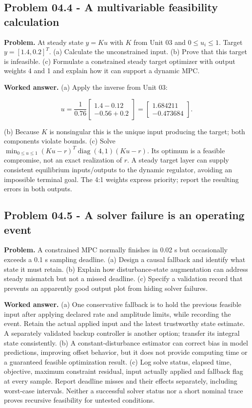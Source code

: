 \documentclass[11pt,a4paper]{article}
\begin{document}
\subsection{Problem 04.4 - A multivariable feasibility calculation}
\textbf{Problem.} At steady state $y=Ku$ with $K$ from Unit 03 and $0\leq u_i\leq1$. Target $y=[1.4,0.2]^T$. (a) Calculate the unconstrained input. (b) Prove that this target is infeasible. (c) Formulate a constrained steady target optimizer with output weights 4 and 1 and explain how it can support a dynamic MPC.


\textbf{Worked answer.} (a) Apply the inverse from Unit 03:


\[u=\frac{1}{0.76}\begin{bmatrix}1.4-0.12\\-0.56+0.2\end{bmatrix}=\begin{bmatrix}1.684211\\-0.473684\end{bmatrix}.\]

(b) Because $K$ is nonsingular this is the unique input producing the target; both components violate bounds. (c) Solve $\min_{0\leq u\leq1}(Ku-r)^T\operatorname{diag}(4,1)(Ku-r)$. Its optimum is a feasible compromise, not an exact realization of $r$. A steady target layer can supply consistent equilibrium inputs/outputs to the dynamic regulator, avoiding an impossible terminal goal. The 4:1 weights express priority; report the resulting errors in both outputs.

\subsection{Problem 04.5 - A solver failure is an operating event}
\textbf{Problem.} A constrained MPC normally finishes in 0.02 s but occasionally exceeds a 0.1 s sampling deadline. (a) Design a causal fallback and identify what state it must retain. (b) Explain how disturbance-state augmentation can address steady mismatch but not a missed deadline. (c) Specify a validation record that prevents an apparently good output plot from hiding solver failures.


\textbf{Worked answer.} (a) One conservative fallback is to hold the previous feasible input after applying declared rate and amplitude limits, while recording the event. Retain the actual applied input and the latest trustworthy state estimate. A separately validated backup controller is another option; transfer its integral state consistently. (b) A constant-disturbance estimator can correct bias in model predictions, improving offset behavior, but it does not provide computing time or a guaranteed feasible optimization result. (c) Log solve status, elapsed time, objective, maximum constraint residual, input actually applied and fallback flag at every sample. Report deadline misses and their effects separately, including worst-case intervals. Neither a successful solver status nor a short nominal trace proves recursive feasibility for untested conditions.
\end{document}

